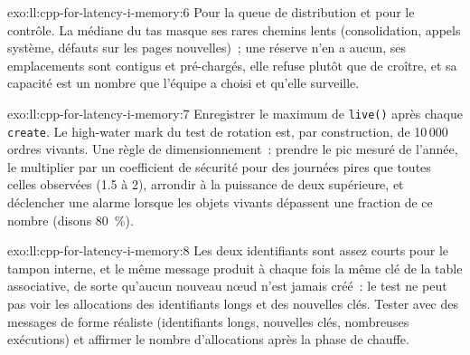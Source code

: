 \begin{solution}{exo:ll:cpp-for-latency-i-memory:6}
Pour la queue de distribution et pour le contrôle. La médiane du tas masque ses rares chemins lents (consolidation, appels système, défauts sur les
pages nouvelles)~; une réserve n'en a aucun, ses emplacements sont contigus et pré-chargés, elle refuse plutôt que de croître, et sa capacité est un
nombre que l'équipe a choisi et qu'elle surveille.
\end{solution}

\begin{solution}{exo:ll:cpp-for-latency-i-memory:7}
Enregistrer le maximum de \texttt{live()} après chaque \texttt{create}. Le high-water mark du test de rotation est, par construction, de 10\,000
ordres vivants. Une règle de dimensionnement~: prendre le pic mesuré de l'année, le multiplier par un coefficient de sécurité pour des journées pires que toutes celles
observées (1.5 à 2), arrondir à la puissance de deux supérieure, et déclencher une alarme lorsque les objets vivants dépassent une fraction de ce nombre (disons 80~\%).
\end{solution}

\begin{solution}{exo:ll:cpp-for-latency-i-memory:8}
Les deux identifiants sont assez courts pour le tampon interne, et le même message produit à chaque fois la même clé de la table associative, de sorte qu'aucun nouveau
nœud n'est jamais créé~: le test ne peut pas voir les allocations des identifiants longs et des nouvelles clés.
Tester avec des messages de forme réaliste (identifiants longs, nouvelles clés, nombreuses exécutions) et affirmer le nombre d'allocations après la phase de chauffe.
\end{solution}

